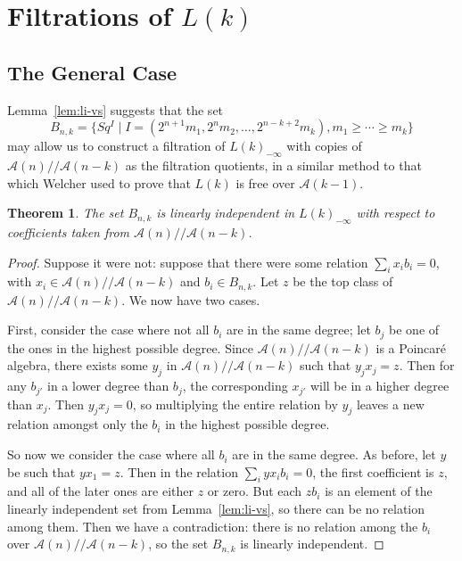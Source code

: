 \documentclass{article}
\newcommand{\A}{\mathcal{A}}
\newcommand{\mmod}{/\!/\!}
\newcommand{\Lkm}[1][k]{L{(#1)}_{-\infty}}
\newtheorem{thm}{Theorem}
\begin{document}
\section{Filtrations of \boldmath$L(k)$}\label{sec:lk}

\subsection{The General Case}

Lemma~\ref{lem:li-vs} suggests that the set
\[ B_{n,k} = \{Sq^I \mid I = (2^{n+1}m_1, 2^n m_2, \ldots, 2^{n-k+2}m_k), m_1 \geq \cdots \geq m_k \} \]
may allow us to construct a filtration of $\Lkm$ with copies of $\A(n)\mmod\A(n-k)$ as the filtration quotients, in a similar method to that which Welcher used to prove that $L(k)$ is free over $\A(k-1)$.

\begin{thm}\label{thm:li-module}
  The set $B_{n,k}$ is linearly independent in $\Lkm$ with respect to coefficients taken from $\A(n)\mmod\A(n-k)$.
\end{thm}

\begin{proof}
  Suppose it were not: suppose that there were some relation $\sum_i x_i b_i = 0$, with $x_i\in\A(n)\mmod\A(n-k)$ and $b_i\in B_{n,k}$.  Let $z$ be the top class of $\A(n)\mmod\A(n-k)$.  We now have two cases.

  First, consider the case where not all $b_i$ are in the same degree; let $b_j$ be one of the ones in the highest possible degree.  Since $\A(n)\mmod\A(n-k)$ is a Poincar\'e algebra, there exists some $y_j$ in $\A(n)\mmod\A(n-k)$ such that $y_j x_j = z$.  Then for any $b_{j'}$ in a lower degree than $b_j$, the corresponding $x_{j'}$ will be in a higher degree than $x_j$.  Then $y_j x_j = 0$, so multiplying the entire relation by $y_j$ leaves a new relation amongst only the $b_i$ in the highest possible degree.

  So now we consider the case where all $b_i$ are in the same degree.  As before, let $y$ be such that $y x_1 = z$.  Then in the relation $\sum_i y x_i b_i = 0$, the first coefficient is $z$, and all of the later ones are either $z$ or zero.  But each $z b_i$ is an element of the linearly independent set from Lemma~\ref{lem:li-vs}, so there can be no relation among them.  Then we have a contradiction: there is no relation among the $b_i$ over $\A(n)\mmod\A(n-k)$, so the set $B_{n,k}$ is linearly independent.
\end{proof}
\end{document}
